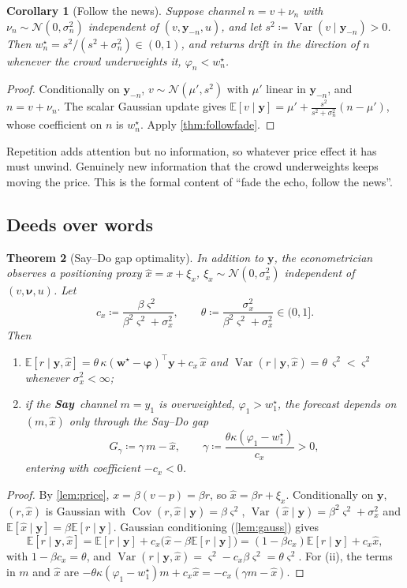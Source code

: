 \documentclass[11pt,a4paper]{article}
\theoremstyle{plain}
\newtheorem{theorem}{Theorem}[section]
\newtheorem{corollary}[theorem]{Corollary}
\theoremstyle{definition}
\theoremstyle{remark}
\newcommand{\E}{\mathbb{E}}
\newcommand{\N}{\mathcal{N}}
\newcommand{\w}{\bm{w}}
\newcommand{\y}{\bm{y}}
\newcommand{\bphi}{\bm{\varphi}}
\DeclareMathOperator{\Var}{Var}
\DeclareMathOperator{\Cov}{Cov}
\newcommand{\SAY}{\textcolor{say}{\textbf{Say}}}
\begin{document}
\begin{corollary}[Follow the news]\label{cor:news}
Suppose channel $n=v+\nu_n$ with $\nu_n\sim\N(0,\sigma_n^2)$ independent of $(v,\y_{-n},u)$, and let $s^2\coloneqq\Var(v\mid\y_{-n})>0$. Then $w^\star_n=s^2/(s^2+\sigma_n^2)\in(0,1)$, and returns drift in the direction of $n$ whenever the crowd underweights it, $\varphi_n<w^\star_n$.
\end{corollary}
\begin{proof}
Conditionally on $\y_{-n}$, $v\sim\N(\mu',s^2)$ with $\mu'$ linear in $\y_{-n}$, and $n=v+\nu_n$. The scalar Gaussian update gives $\E[v\mid\y]=\mu'+\frac{s^2}{s^2+\sigma_n^2}(n-\mu')$, whose coefficient on $n$ is $w^\star_n$. Apply \cref{thm:followfade}.
\end{proof}

\begin{intuition}
Repetition adds attention but no information, so whatever price effect it has must unwind. Genuinely new information that the crowd underweights keeps moving the price. This is the formal content of ``fade the echo, follow the news''.
\end{intuition}

\subsection{Deeds over words}

\begin{theorem}[Say--Do gap optimality]\label{thm:saydo}
In addition to $\y$, the econometrician observes a positioning proxy $\hat x=x+\xi_x$, $\xi_x\sim\N(0,\sigma_x^2)$ independent of $(v,\bm\nu,u)$. Let
\[
  c_x\coloneqq\frac{\beta\varsigma^2}{\beta^2\varsigma^2+\sigma_x^2},\qquad \theta\coloneqq\frac{\sigma_x^2}{\beta^2\varsigma^2+\sigma_x^2}\in(0,1].
\]
Then
\begin{enumerate}[label=(\roman*)]
  \item $\E[r\mid\y,\hat x]=\theta\,\kappa(\w^\star-\bphi)^\top\y+c_x\,\hat x$ and $\Var(r\mid\y,\hat x)=\theta\,\varsigma^2<\varsigma^2$ whenever $\sigma_x^2<\infty$;
  \item if the \SAY\ channel $m=y_1$ is overweighted, $\varphi_1>w^\star_1$, the forecast depends on $(m,\hat x)$ only through the \emph{Say--Do gap}
  \[
    G_\gamma\coloneqq\gamma\, m-\hat x,\qquad \gamma\coloneqq\frac{\theta\kappa(\varphi_1-w^\star_1)}{c_x}>0,
  \]
  entering with coefficient $-c_x<0$.
\end{enumerate}
\end{theorem}
\begin{proof}
By \cref{lem:price}, $x=\beta(v-p)=\beta r$, so $\hat x=\beta r+\xi_x$. Conditionally on $\y$, $(r,\hat x)$ is Gaussian with $\Cov(r,\hat x\mid\y)=\beta\varsigma^2$, $\Var(\hat x\mid\y)=\beta^2\varsigma^2+\sigma_x^2$ and $\E[\hat x\mid\y]=\beta\E[r\mid\y]$. Gaussian conditioning (\cref{lem:gauss}) gives
\[
  \E[r\mid\y,\hat x]=\E[r\mid\y]+c_x\big(\hat x-\beta\E[r\mid\y]\big)=(1-\beta c_x)\E[r\mid\y]+c_x\hat x,
\]
with $1-\beta c_x=\theta$, and $\Var(r\mid\y,\hat x)=\varsigma^2-c_x\beta\varsigma^2=\theta\varsigma^2$. For (ii), the terms in $m$ and $\hat x$ are $-\theta\kappa(\varphi_1-w^\star_1)m+c_x\hat x=-c_x(\gamma m-\hat x)$.
\end{proof}
\end{document}
